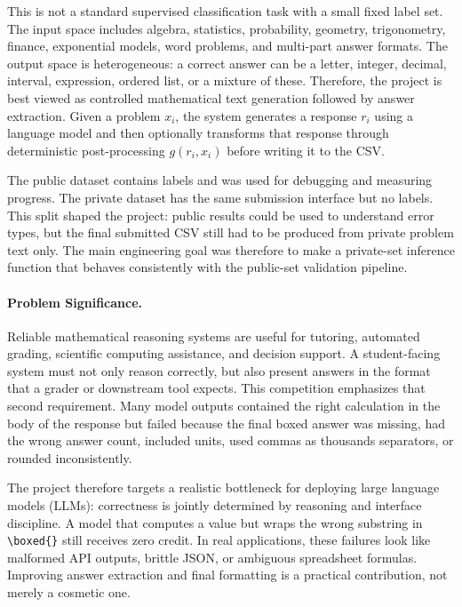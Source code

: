 \documentclass{article}
\begin{document}
This is not a standard supervised classification task with a small fixed label set. The input space includes algebra, statistics, probability, geometry, trigonometry, finance, exponential models, word problems, and multi-part answer formats. The output space is heterogeneous: a correct answer can be a letter, integer, decimal, interval, expression, ordered list, or a mixture of these. Therefore, the project is best viewed as controlled mathematical text generation followed by answer extraction. Given a problem $x_i$, the system generates a response $r_i$ using a language model and then optionally transforms that response through deterministic post-processing $g(r_i, x_i)$ before writing it to the CSV.

The public dataset contains labels and was used for debugging and measuring progress. The private dataset has the same submission interface but no labels. This split shaped the project: public results could be used to understand error types, but the final submitted CSV still had to be produced from private problem text only. The main engineering goal was therefore to make a private-set inference function that behaves consistently with the public-set validation pipeline.

\paragraph{Problem Significance.}
Reliable mathematical reasoning systems are useful for tutoring, automated grading, scientific computing assistance, and decision support. A student-facing system must not only reason correctly, but also present answers in the format that a grader or downstream tool expects. This competition emphasizes that second requirement. Many model outputs contained the right calculation in the body of the response but failed because the final boxed answer was missing, had the wrong answer count, included units, used commas as thousands separators, or rounded inconsistently.

The project therefore targets a realistic bottleneck for deploying large language models (LLMs): correctness is jointly determined by reasoning and interface discipline. A model that computes a value but wraps the wrong substring in \texttt{\textbackslash boxed\{\}} still receives zero credit. In real applications, these failures look like malformed API outputs, brittle JSON, or ambiguous spreadsheet formulas. Improving answer extraction and final formatting is a practical contribution, not merely a cosmetic one.
\end{document}
